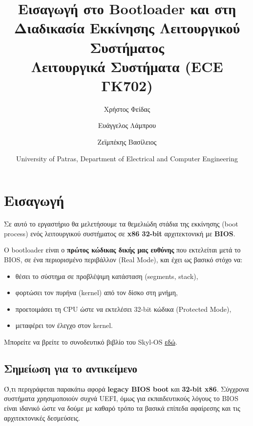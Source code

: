 \documentclass[18pt]{extarticle}
\title{Εισαγωγή στο Bootloader και στη Διαδικασία Εκκίνησης Λειτουργικού Συστήματος\\
Λειτουργικά Συστήματα (ECE ΓΚ702)} %
\author{
    \footnotesize Χρήστος Φείδας\\
    \footnotesize \src{fidas@upatras.gr} \and
    \footnotesize Ευάγγελος Λάμπρου\\
    \footnotesize \src{e.lamprou@upnet.gr} \and
    \footnotesize Ζεϊμπέκης Βασίλειος\\
    \footnotesize \src{bzeimp@gmail.com}
} %
\date{University of Patras, Department of Electrical and Computer Engineering} %
\begin{document}
\pagestyle{fancy}
\fancyhf{} %
\renewcommand{\headrulewidth}{0pt}
\fancyhead{} %
\fancyfoot{} %
\fancyfoot[R]{\thepage}

\maketitle


\section{Εισαγωγή}

Σε αυτό το εργαστήριο θα μελετήσουμε τα θεμελιώδη στάδια της εκκίνησης (boot process) ενός
λειτουργικού συστήματος σε \textbf{x86 32-bit} αρχιτεκτονική με \textbf{BIOS}.

Ο bootloader είναι ο \textbf{πρώτος κώδικας δικής μας ευθύνης} που εκτελείται μετά το BIOS, σε ένα
περιορισμένο περιβάλλον (Real Mode), και έχει ως βασικό στόχο να:
\begin{itemize}
    \item θέσει το σύστημα σε προβλέψιμη κατάσταση (segments, stack),
    \item φορτώσει τον πυρήνα (kernel) από τον δίσκο στη μνήμη,
    \item προετοιμάσει τη CPU ώστε να εκτελέσει 32-bit κώδικα (Protected Mode),
    \item μεταφέρει τον έλεγχο στον kernel.
\end{itemize}

Μπορείτε να βρείτε το συνοδευτικό βιβλίο του Skyl-OS \href{https://github.com/Billyzeim/Skyl-OS/blob/main/docs/book/main.pdf}{εδώ}.

\subsection{Σημείωση για το αντικείμενο}

Ό,τι περιγράφεται παρακάτω αφορά \textbf{legacy BIOS boot} και \textbf{32-bit x86}. Σύγχρονα συστήματα
χρησιμοποιούν συχνά UEFI, όμως για εκπαιδευτικούς λόγους το BIOS είναι ιδανικό ώστε να δούμε με
καθαρό τρόπο τα βασικά επίπεδα αφαίρεσης και τις αρχιτεκτονικές δεσμεύσεις.
\end{document}
